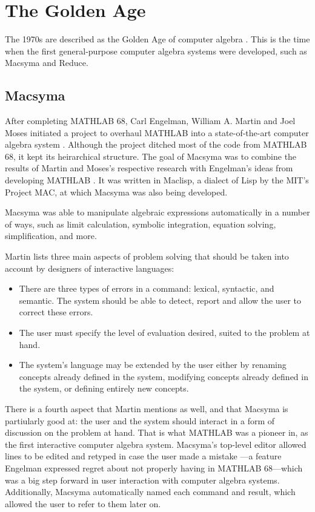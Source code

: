 \section{The Golden Age}\label{subsec:the-golden-age}

The 1970s are described as the Golden Age of computer algebra \parencite{davenport1994computer}. This is the time when the first general-purpose computer algebra systems were developed, such as Macsyma and Reduce. 

\subsection{Macsyma}\label{sec:macsyma}
After completing MATHLAB 68, Carl Engelman, William A. Martin and Joel Moses initiated a project to overhaul MATHLAB into a state-of-the-art computer algebra system \parencite{engelman1971legacy}. Although the project ditched most of the code from MATHLAB 68, it kept its heirarchical structure. The goal of Macsyma was to combine the results of Martin and Moses's respective research with Engelman's ideas from developing MATHLAB \parencite{martin1971macsyma}. It was written in Maclisp, a dialect of Lisp by the MIT's Project MAC, at which Macsyma was also being developed.

Macsyma was able to manipulate algebraic expressions automatically in a number of ways, such as limit calculation, symbolic integration, equation solving, simplification, and more.

Martin \parencite*{martin1971macsyma} lists three main aspects of problem solving that should be taken into account by designers of interactive languages:

\begin{itemize}
    \item There are three types of errors in a command: lexical, syntactic, and semantic. The system should be able to detect, report and allow the user to correct these errors.
    \item The user must specify the level of evaluation desired, suited to the problem at hand.
    \item The system's language may be extended by the user either by renaming concepts already defined in the system, modifying concepts already defined in the system, or defining entirely new concepts.
\end{itemize}

There is a fourth aspect that Martin mentions as well, and that Macsyma is partiularly good at: the user and the system should interact in a form of discussion on the problem at hand. That is what MATHLAB was a pioneer in, as the first interactive computer algebra system. Macsyma's top-level editor allowed lines to be edited and retyped in case the user made a mistake \parencite{martin1971macsyma}---a feature Engelman \parencite*{engelman1971legacy} expressed regret about not properly having in MATHLAB 68---which was a big step forward in user interaction with computer algebra systems. Additionally, Macsyma automatically named each command and result, which allowed the user to refer to them later on.

